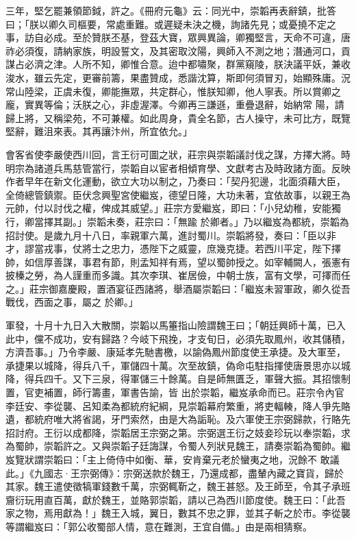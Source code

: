 \begin{pinyinscope}
 三年，堅乞罷兼領節鉞，許之。《冊府元龜》云：同光中，崇韜再表辭鎮，批答曰；「朕以卿久司樞要，常處重難。或遲疑未決之機，詢諸先見；或憂撓不定之事，訪自必成。至於贊朕丕基，登茲大寶，眾興異論，卿獨堅言，天命不可違，唐祚必須復，請納家族，明設誓文，及其密取汶陽，興師入不測之地；潛通河口，貢謀占必濟之津。人所不知，卿惟合意。迨中都嘯聚，群黨窺陵，朕決議平妖，兼收浚水，雖云先定，更審前籌，果盡贊成，悉諧沈算，斯即何須冒刃，始顯殊庸。況常山陸梁，正虞未復，卿能撫眾，共定群心，惟朕知卿，他人寧表。所以賞卿之龐，實異等倫；沃朕之心，非虛渥澤。今卿再三謙遜，重疊退辭，始納常
 陽，請歸上將，又稱梁苑，不可兼權。如此周身，貴全名節，古人操守，未可比方，既覽堅辭，難沮來表。其再讓汴州，所宜依允。」



 會客省使李嚴使西川回，言王衍可圖之狀，莊宗與崇韜議討伐之謀，方擇大將。時明宗為諸道兵馬慈管當行，崇韜自以宦者相傾育學、文獻考古及時政諸方面。反映作者早年在新文化運動，欲立大功以制之，乃奏曰：「契丹犯邊，北面須藉大臣，全倚總管鎮禦。臣伏念興聖宮使繼岌，德望日隆，大功未著，宜依故事，以親王為元帥，付以討伐之權，俾成其威望。」莊宗方愛繼岌，即曰：「小兒幼稚，安能獨行，卿當擇其副。」崇韜未奏，莊宗曰：「無踰
 於卿者。」乃以繼岌為都統，崇韜為招討使。是歲九月十八日，率親軍六萬，進討蜀川。崇韜將發，奏曰：「臣以非才，謬當戎事，仗將士之忠力，憑陛下之威靈，庶幾克捷。若西川平定，陛下擇帥，如信厚善謀，事君有節，則孟知祥有焉，望以蜀帥授之。如宰輔闕人，張憲有披榛之勞，為人謹重而多識。其次李琪、崔居儉，中朝士族，富有文學，可擇而任之。」莊宗御嘉慶殿，置酒宴征西諸將，舉酒屬崇韜曰：「繼岌未習軍政，卿久從吾戰伐，西面之事，屬之
 於卿。」



 軍發，十月十九日入大散關，崇韜以馬箠指山險謂魏王曰；「朝廷興師十萬，已入此中，儻不成功，安有歸路？今岐下飛挽，才支旬日，必須先取鳳州，收其儲積，方濟吾事。」乃令李嚴、康延孝先馳書檄，以諭偽鳳州節度使王承捷。及大軍至，承捷果以城降，得兵八千，軍儲四十萬。次至故鎮，偽命屯駐指揮使唐景思亦以城降，得兵四千。又下三泉，得軍儲三十餘萬。自是師無匱乏，軍聲大振。其招懷制置，官吏補置，師行籌畫，軍書告諭，皆
 出於崇韜，繼岌承命而已。莊宗令內官李廷安、李從襲、呂知柔為都統府紀綱，見崇韜幕府繁重，將吏輻輳，降人爭先賂遺，都統府唯大將省謁，牙門索然，由是大為詬恥。及六軍使王宗弼歸款，行賂先招討府。王衍以成都降，崇韜居王宗弼之第。宗弼選王衍之妓妾珍玩以奉崇韜，求為蜀帥，崇韜許之。又與崇韜子廷誨謀，令蜀人列狀見魏王，請奏崇韜為蜀帥。繼岌覽狀謂崇韜曰：「主上倚侍中如衡、華，安肯棄元老於蠻夷之地，況餘不
 敢議此。」《九國志·王宗弼傳》：宗弼送款於魏王，乃還成都，盡輦內藏之寶貨，歸於其家。魏王遣使徵犒軍錢數千萬，宗弼輒靳之，魏王甚怒。及王師至，令其子承班齎衍玩用直百萬，獻於魏王，並賂郭崇韜，請以己為西川節度使。魏王曰：「此吾家之物，焉用獻為！」魏王入城，翼日，數其不忠之罪，並其子斬之於市。李從襲等謂繼岌曰：「郭公收蜀部人情，意在難測，王宜自備。」由是兩相猜察。




\end{pinyinscope}
